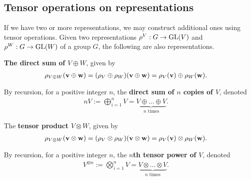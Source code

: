 \subsection{Tensor operations on representations}\label{sect:tensorrepr}

If we have two or more representations, we may construct additional ones using tensor operations. Given two representations $\rho^V: G \rightarrow \text{GL}(V)$ and $\rho^W: G \rightarrow \text{GL}(W)$ of a group $G$, the following are also representations.

\textbf{The direct sum of $V \oplus W$}, given by 
\begin{align*}
	\rho_{V \oplus W}(\mathbf{v} \oplus \mathbf{w}) = (\rho_V \oplus \rho_W)(\mathbf{v} \oplus \mathbf{w}) = \rho_V(\mathbf{v}) \oplus \rho_W(\mathbf{w}).
\end{align*}

By recursion, for a positive integer $n$, the \textbf{direct sum of $n$ copies of $V$}, denoted
\begin{align*}
	nV := \bigoplus_{i=1}^n V = \underset{\text{$n$ times}}{\underbrace{V \oplus \dots \oplus V}}.
\end{align*}

The \textbf{tensor product $V \otimes W$}, given by
\begin{align*}
	\rho_{V \otimes W}(\mathbf{v} \otimes \mathbf{w}) = (\rho_V \otimes \rho_W)(\mathbf{v} \otimes \mathbf{w}) = \rho_V(\mathbf{v}) \otimes \rho_W(\mathbf{w}).
\end{align*}

By recursion, for a positive integer $n$, the \textbf{$n$th tensor power of $V$}, denoted
\begin{align*}
	V^{\otimes n} := \bigotimes_{i=1}^n V = \underset{\text{$n$ times}}{\underbrace{V \otimes \dots \otimes V}}.
\end{align*}





